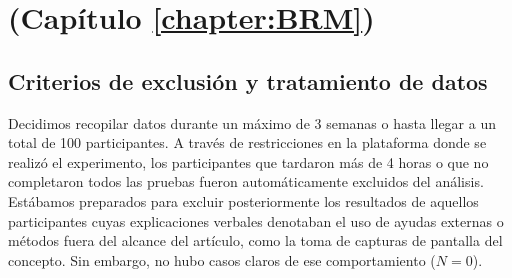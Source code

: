 
\chapter{(Capítulo \ref{chapter:BRM})}

\section{Criterios de exclusión y tratamiento de datos}\label{Sec:ExclusionCriteria}

Decidimos recopilar datos durante un máximo de 3 semanas o hasta llegar a un total de 100 participantes. A través de restricciones en la plataforma donde se realizó el experimento, los participantes que tardaron más de 4 horas o que no completaron todos las pruebas fueron automáticamente excluidos del análisis. Estábamos preparados para excluir posteriormente los resultados de aquellos participantes cuyas explicaciones verbales denotaban el uso de ayudas externas o métodos fuera del alcance del artículo, como la toma de capturas de pantalla del concepto. Sin embargo, no hubo casos claros de ese comportamiento ($ N = 0 $).

